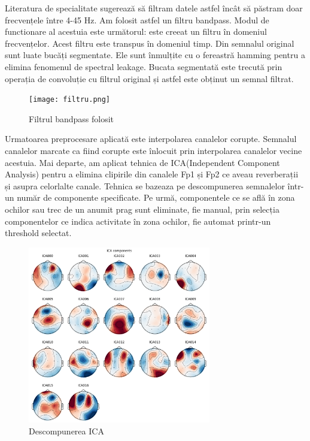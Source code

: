 Literatura de specialitate sugerează să filtram datele astfel încât să păstram doar frecvențele între 4-45 Hz. Am folosit astfel un filtru bandpass. Modul de functionare al acestuia este următorul: este creeat un filtru în domeniul frecvențelor. Acest filtru este transpus în domeniul timp. Din semnalul original sunt luate bucăți segmentate. Ele sunt înmulțite cu o fereastră hamming pentru a elimina fenomenul de spectral leakage. Bucata segmentată este trecută prin operația de convoluție cu filtrul original și astfel este obținut un semnal filtrat.

\setlength{\abovecaptionskip}{0pt}
\setlength{\belowcaptionskip}{0pt}
\clearpage
\begin{figure}[h]
    \centering
    \texttt{[image: filtru.png]}
    \caption{Filtrul bandpass folosit}
    \label{fig:vizualizare_filtru}
\end{figure}

Urmatoarea preprocesare aplicată este interpolarea canalelor corupte. Semnalul canalelor marcate ca fiind corupte este înlocuit prin interpolarea canalelor vecine acestuia. Mai departe, am aplicat tehnica de ICA(Independent Component Analysis) pentru a elimina clipirile din canalele Fp1 și Fp2 ce aveau reverberații și asupra celorlalte canale. Tehnica se bazeaza pe descompunerea semnalelor într-un număr de componente specificate. Pe urmă, componentele ce se află în zona ochilor sau trec de un anumit prag sunt eliminate, fie manual, prin selecția componentelor ce indica activitate în zona ochilor, fie automat printr-un threshold selectat.

\vspace{1em}
\begin{figure}[h]
    \centering
    \includegraphics[width=8cm]{images/ica_components.png}
    \caption{Descompunerea ICA}
    \label{fig:vizualizare_filtru}
\end{figure}


